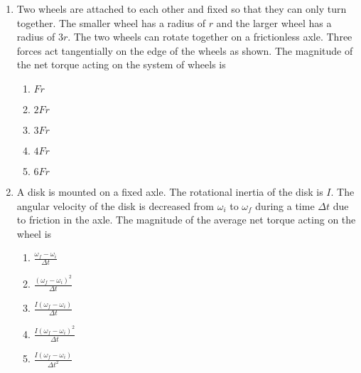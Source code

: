 \documentclass{../../../oss-apphys}
\begin{document}
\begin{multicols*}{2}
\begin{enumerate}[leftmargin=18pt]
  \item Two wheels are attached to each other and fixed so that they can only
    turn together. The smaller wheel has a radius of $r$ and the larger wheel
    has a radius of $3r$. The two wheels can rotate together on a frictionless
    axle. Three forces act tangentially on the edge of the wheels as shown.
    The magnitude of the net torque acting on the system of wheels is
    \begin{center}
    \end{center}
    \begin{enumerate}[nosep,leftmargin=18pt,label=(\Alph*)]
    \item$Fr$
    \item$2Fr$
    \item$3Fr$
    \item$4Fr$
    \item$6Fr$
    \end{enumerate}
    
  \item A disk is mounted on a fixed axle. The rotational inertia of the disk is
    $I$. The angular velocity of the disk is decreased from $\omega_i$ to
    $\omega_f$ during a time $\Delta t$ due to friction in the axle. The
    magnitude of the average net torque acting on the wheel is
    \begin{enumerate}[noitemsep,topsep=0pt,leftmargin=18pt,label=(\Alph*)]
    \item $\displaystyle\frac{\omega_f-\omega_i}{\Delta t}$
    \item $\displaystyle\frac{(\omega_f-\omega_i)^2}{\Delta t}$
    \item $\displaystyle\frac{I(\omega_f-\omega_i)}{\Delta t}$
    \item $\displaystyle\frac{I(\omega_f-\omega_i)^2}{\Delta t}$
    \item $\displaystyle\frac{I(\omega_f-\omega_i)}{\Delta t^2}$
    \end{enumerate}
    

\end{enumerate}
\end{multicols*}
\end{document}
